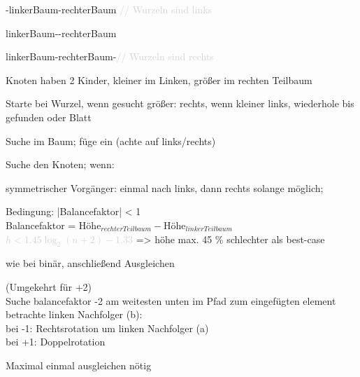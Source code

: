 

 -linkerBaum-rechterBaum \textcolor{lightgray}{// Wurzeln sind links}

 linkerBaum--rechterBaum

 linkerBaum-rechterBaum-\textcolor{lightgray}{// Wurzeln sind rechts}

Knoten haben 2 Kinder, kleiner im Linken, größer im rechten Teilbaum

Starte bei Wurzel, wenn gesucht größer: rechts, wenn kleiner links, wiederhole bis gefunden oder Blatt 
 
Suche im Baum; füge ein (achte auf links/rechts)
 
Suche den Knoten; wenn:


symmetrischer Vorgänger: einmal nach links, dann rechts solange möglich;

Bedingung: |Balancefaktor| < 1 \\
Balancefaktor = $\text{Höhe}_{rechter Teilbaum} - \text{Höhe}_{linker Teilbaum} $\\
\textcolor{lightgray}{$ h < 1.45 \log_2(n+2)-1.33$ }=> höhe max. 45 \% schlechter als best-case

 wie bei binär, anschließend Ausgleichen

(Umgekehrt für +2)\\
Suche balancefaktor -2 am weitesten unten im Pfad zum eingefügten element\\
betrachte linken Nachfolger (b):\\
bei -1: Rechtsrotation um linken Nachfolger (a)\\
bei +1: Doppelrotation

Maximal einmal ausgleichen nötig




